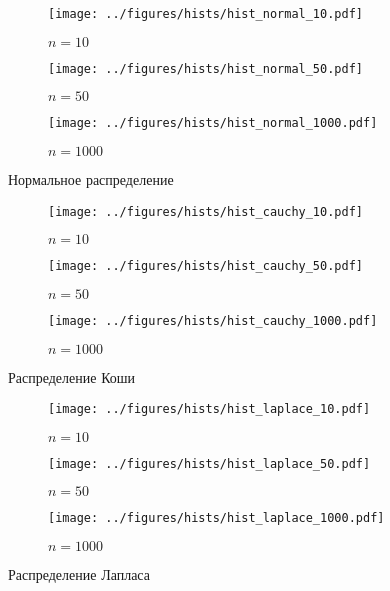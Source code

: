 \documentclass[12pt]{report}
\begin{document}
	\begin{figure}[H]
		\centering
		\begin{subfigure}[t]{.3\linewidth}
			\centering\texttt{[image: ../figures/hists/hist\_normal\_10.pdf]}
			\caption*{$n = 10$}
		\end{subfigure}
		\begin{subfigure}[t]{.3\linewidth}
			\centering\texttt{[image: ../figures/hists/hist\_normal\_50.pdf]}
			\caption*{$n = 50$}
		\end{subfigure}
		\begin{subfigure}[t]{.3\linewidth}
			\centering\texttt{[image: ../figures/hists/hist\_normal\_1000.pdf]}
			\caption*{$n = 1000$}
		\end{subfigure}
		\caption{Нормальное распределение}
	\end{figure}
	\begin{figure}[H]
		\centering
		\begin{subfigure}[t]{.3\linewidth}
			\centering\texttt{[image: ../figures/hists/hist\_cauchy\_10.pdf]}
			\caption*{$n = 10$}
		\end{subfigure}
		\begin{subfigure}[t]{.3\linewidth}
			\centering\texttt{[image: ../figures/hists/hist\_cauchy\_50.pdf]}
			\caption*{$n = 50$}
		\end{subfigure}
		\begin{subfigure}[t]{.3\linewidth}
			\centering\texttt{[image: ../figures/hists/hist\_cauchy\_1000.pdf]}
			\caption*{$n = 1000$}
		\end{subfigure}
		\caption{Распределение Коши}
	\end{figure}
	\begin{figure}[H]
		\centering
		\begin{subfigure}[t]{.3\linewidth}
			\centering\texttt{[image: ../figures/hists/hist\_laplace\_10.pdf]}
			\caption*{$n = 10$}
		\end{subfigure}
		\begin{subfigure}[t]{.3\linewidth}
			\centering\texttt{[image: ../figures/hists/hist\_laplace\_50.pdf]}
			\caption*{$n = 50$}
		\end{subfigure}
		\begin{subfigure}[t]{.3\linewidth}
			\centering\texttt{[image: ../figures/hists/hist\_laplace\_1000.pdf]}
			\caption*{$n = 1000$}
		\end{subfigure}
		\caption{Распределение Лапласа}
	\end{figure}
\end{document}
